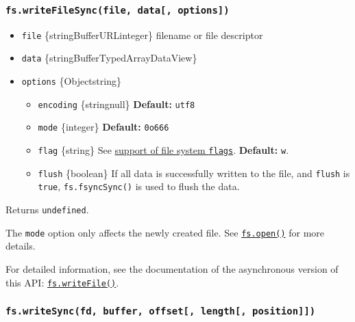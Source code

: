 \subsubsection{\texorpdfstring{\texttt{fs.writeFileSync(file,\ data{[},\ options{]})}}{fs.writeFileSync(file, data{[}, options{]})}}\label{fs.writefilesyncfile-data-options}

\begin{itemize}
\tightlist
\item
  \texttt{file} \{string\textbar Buffer\textbar URL\textbar integer\}
  filename or file descriptor
\item
  \texttt{data}
  \{string\textbar Buffer\textbar TypedArray\textbar DataView\}
\item
  \texttt{options} \{Object\textbar string\}

  \begin{itemize}
  \tightlist
  \item
    \texttt{encoding} \{string\textbar null\} \textbf{Default:}
    \texttt{\textquotesingle{}utf8\textquotesingle{}}
  \item
    \texttt{mode} \{integer\} \textbf{Default:} \texttt{0o666}
  \item
    \texttt{flag} \{string\} See \hyperref[file-system-flags]{support of
    file system \texttt{flags}}. \textbf{Default:}
    \texttt{\textquotesingle{}w\textquotesingle{}}.
  \item
    \texttt{flush} \{boolean\} If all data is successfully written to
    the file, and \texttt{flush} is \texttt{true},
    \texttt{fs.fsyncSync()} is used to flush the data.
  \end{itemize}
\end{itemize}

Returns \texttt{undefined}.

The \texttt{mode} option only affects the newly created file. See
\hyperref[fsopenpath-flags-mode-callback]{\texttt{fs.open()}} for more
details.

For detailed information, see the documentation of the asynchronous
version of this API:
\hyperref[fswritefilefile-data-options-callback]{\texttt{fs.writeFile()}}.

\subsubsection{\texorpdfstring{\texttt{fs.writeSync(fd,\ buffer,\ offset{[},\ length{[},\ position{]}{]})}}{fs.writeSync(fd, buffer, offset{[}, length{[}, position{]}{]})}}\label{fs.writesyncfd-buffer-offset-length-position}

